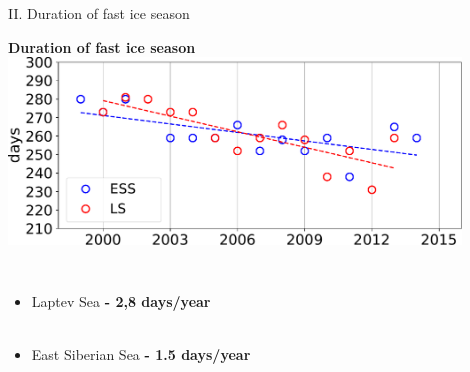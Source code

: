 \documentclass[8pt]{beamer}
\begin{document}
\setwatermark{\fontsize{125pt}{125pt}\selectfont{}}
\begin{frame}[fragile]{II. Duration of fast ice season}
	\begin{center}
		\textbf{Duration of fast ice season}
		\includegraphics[width=0.9\textwidth]{./img/SeasonLength.pdf}
	\end{center}
	\begin{columns}
		\begin{itemize}
			\item Laptev Sea \textbf{- 2,8 days/year}\\~\\
			\item  East Siberian Sea \textbf{- 1.5 days/year}
		\end{itemize}
	\end{columns}


\end{frame}
\end{document}
